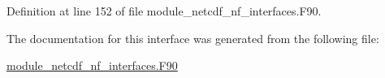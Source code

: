 Definition at line 152 of file module\+\_\+netcdf\+\_\+nf\+\_\+interfaces.\+F90.



The documentation for this interface was generated from the following file\+:\begin{DoxyCompactItemize}
\item 
\hyperlink{module__netcdf__nf__interfaces_8F90}{module\+\_\+netcdf\+\_\+nf\+\_\+interfaces.\+F90}\end{DoxyCompactItemize}
